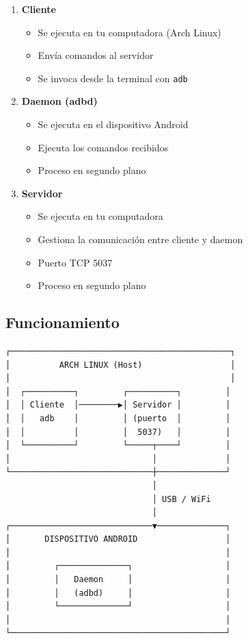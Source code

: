\documentclass[
  doc,
  floatsintext,
  longtable,
  a4paper,
  nolmodern,
  notxfonts,
  notimes,
  12pt,
  colorlinks=true,linkcolor=blue,citecolor=blue,urlcolor=blue]{apa7}
\providecommand{\tightlist}{%
  \setlength{\itemsep}{0pt}\setlength{\parskip}{0pt}}
\begin{document}
\begin{enumerate}
\def\labelenumi{\arabic{enumi}.}
\item
  \textbf{Cliente}

  \begin{itemize}
  \tightlist
  \item
    Se ejecuta en tu computadora (Arch Linux)
  \item
    Envía comandos al servidor
  \item
    Se invoca desde la terminal con \texttt{adb}
  \end{itemize}
\item
  \textbf{Daemon (adbd)}

  \begin{itemize}
  \tightlist
  \item
    Se ejecuta en el dispositivo Android
  \item
    Ejecuta los comandos recibidos
  \item
    Proceso en segundo plano
  \end{itemize}
\item
  \textbf{Servidor}

  \begin{itemize}
  \tightlist
  \item
    Se ejecuta en tu computadora
  \item
    Gestiona la comunicación entre cliente y daemon
  \item
    Puerto TCP 5037
  \item
    Proceso en segundo plano
  \end{itemize}
\end{enumerate}

\subsection{Funcionamiento}\label{funcionamiento}

\begin{verbatim}
┌─────────────────────────────────────────────┐
│          ARCH LINUX (Host)                  │
│                                             │
│  ┌──────────┐         ┌──────────┐         │
│  │ Cliente  │────────▶│ Servidor │         │
│  │   adb    │         │ (puerto  │         │
│  │          │         │  5037)   │         │
│  └──────────┘         └─────┬────┘         │
│                             │              │
└─────────────────────────────┼──────────────┘
                              │
                              │ USB / WiFi
                              │
┌─────────────────────────────▼──────────────┐
│       DISPOSITIVO ANDROID                  │
│                                            │
│         ┌──────────────┐                   │
│         │   Daemon     │                   │
│         │   (adbd)     │                   │
│         └──────────────┘                   │
│                                            │
└────────────────────────────────────────────┘
\end{verbatim}
\end{document}
